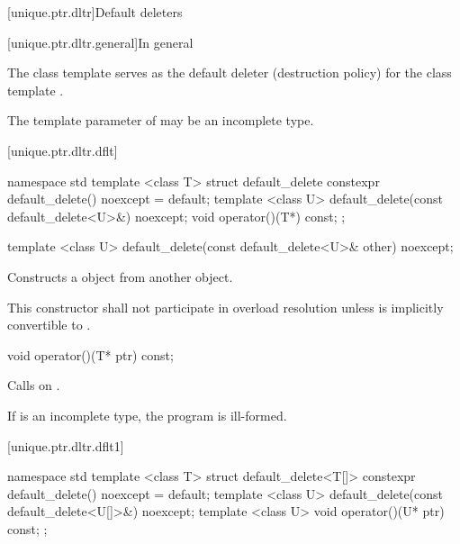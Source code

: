 [unique.ptr.dltr]{Default deleters}

[unique.ptr.dltr.general]{In general}

\pnum
The class template  serves as the default deleter (destruction policy)
for the class template .

\pnum
The template parameter  of  may be
an incomplete type.

[unique.ptr.dltr.dflt]{}

\begin{codeblock}
namespace std {
  template <class T> struct default_delete {
    constexpr default_delete() noexcept = default;
    template <class U> default_delete(const default_delete<U>&) noexcept;
    void operator()(T*) const;
  };
}
\end{codeblock}

%
\begin{itemdecl}
template <class U> default_delete(const default_delete<U>& other) noexcept;
\end{itemdecl}

\begin{itemdescr}
\pnum
\effects Constructs a  object
from another  object.

\pnum
\remarks This constructor shall not participate in overload resolution unless
 is implicitly convertible to .
\end{itemdescr}

%
\begin{itemdecl}
void operator()(T* ptr) const;
\end{itemdecl}

\begin{itemdescr}
\pnum
\effects Calls  on .

\pnum
\remarks If  is an incomplete type, the program is ill-formed.
\end{itemdescr}

[unique.ptr.dltr.dflt1]{}

\begin{codeblock}
namespace std {
  template <class T> struct default_delete<T[]> {
    constexpr default_delete() noexcept = default;
    template <class U> default_delete(const default_delete<U[]>&) noexcept;
    template <class U> void operator()(U* ptr) const;
  };
}
\end{codeblock}

